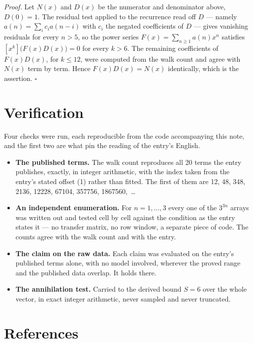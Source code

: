 \documentclass[11pt]{article}
\theoremstyle{definition}
\begin{document}
{\itshape Proof.} Let $N(x)$ and $D(x)$ be the numerator and denominator above, $D(0)=1$. The residual test applied to the recurrence read off $D$ --- namely $a(n) = \sum_i c_i a(n-i)$ with $c_i$ the negated coefficients of $D$ --- gives vanishing residuals for every $n > 5$, so the power series $F(x)=\sum_{n\ge 1}a(n)x^n$ satisfies $[x^k]\bigl(F(x)D(x)\bigr) = 0$ for every $k > 6$. The remaining coefficients of $F(x)D(x)$, for $k \le 12$, were computed from the walk count and agree with $N(x)$ term by term. Hence $F(x)D(x) = N(x)$ identically, which is the assertion. $\square$

\section{Verification}

Four checks were run, each reproducible from the code accompanying this note, and the first two are what pin the reading of the entry's English.

\begin{itemize}

\item {\bfseries The published terms.} The walk count reproduces all 20 terms the entry publishes, exactly, in integer arithmetic, with the index taken from the entry's stated offset (1) rather than fitted. The first of them are 12, 48, 348, 2136, 12228, 67104, 357756, 1867560,~\dots

\item {\bfseries An independent enumeration.} For $n = 1,\dots,3$ every one of the $3^{3n}$ arrays was written out and tested cell by cell against the condition as the entry states it --- no transfer matrix, no row window, a separate piece of code. The counts agree with the walk count and with the entry.

\item {\bfseries The claim on the raw data.} Each claim was evaluated on the entry's published terms alone, with no model involved, wherever the proved range and the published data overlap. It holds there.

\item {\bfseries The annihilation test.} Carried to the derived bound $S = 6$ over the whole vector, in exact integer arithmetic, never sampled and never truncated.

\end{itemize}

\section{References}
\end{document}
